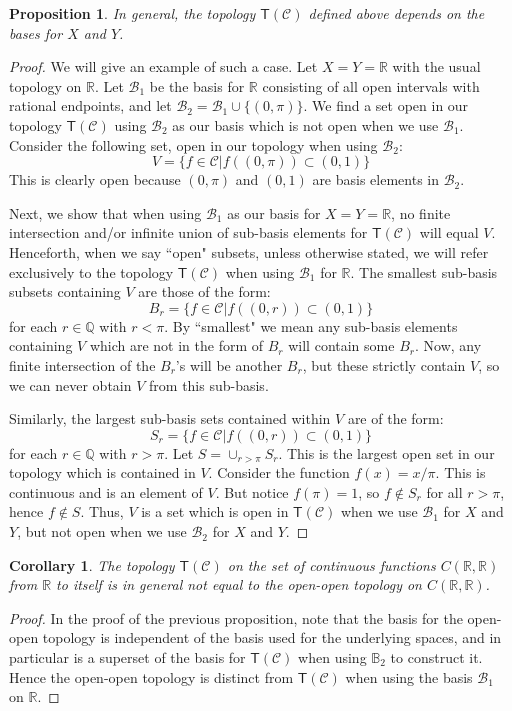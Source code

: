 \documentclass[review]{elsarticle}
\theoremstyle{plain}%
\newtheorem{prop}[thm]{Proposition}
\newtheorem{cor}{Corollary}
\theoremstyle{definition}
\theoremstyle{remark}
\begin{document}
\begin{prop}
	In general, the topology $\mathsf{T}(\mathcal{C})$ defined above depends on the bases for $X$ and $Y$. 
\end{prop}
\begin{proof}
	We will give an example of such a case. Let $X=Y=\mathbb{R}$ with the usual topology on $\mathbb{R}$. Let $\mathcal{B}_1$ be the basis for $\mathbb{R}$ consisting of all open intervals with rational endpoints, and let $\mathcal{B}_2 = \mathcal{B}_1\cup\{(0,\pi)\}$. We find a set open in our topology $\mathsf{T}(\mathcal{C})$ using $\mathcal{B}_2$ as our basis which is not open when we use $\mathcal{B}_1$. Consider the following set, open in our topology when using $\mathcal{B}_2$:
	$$
	V = \{f\in\mathcal{C}| f((0,\pi))\subset(0,1)\}
	$$
	This is clearly open because $(0,\pi)$ and $(0,1)$ are basis elements in $\mathcal{B}_2$. 
	
	Next, we show that when using $\mathcal{B}_1$ as our basis for $X=Y=\mathbb{R}$, no finite intersection and/or infinite union of sub-basis elements for $\mathsf{T}(\mathcal{C})$ will equal $V$. Henceforth, when we say ``open" subsets, unless otherwise stated, we will refer exclusively to the topology $\mathsf{T}(\mathcal{C})$ when using $\mathcal{B}_1$ for $\mathbb{R}$. The smallest sub-basis subsets containing $V$ are those of the form:
	$$
	B_r = \{f\in\mathcal{C} | f((0,r))\subset(0,1)\}
	$$
	for each $r\in\mathbb{Q}$ with $r<\pi$. By ``smallest" we mean any sub-basis elements containing $V$ which are not in the form of $B_r$ will contain some $B_r$. Now, any finite intersection of the $B_r$'s will be another $B_r$, but these strictly contain $V$, so we can never obtain $V$ from this sub-basis. 
	
	Similarly, the largest sub-basis sets contained within $V$ are of the form: 
	$$
	S_r = \{f\in\mathcal{C} | f((0,r))\subset(0,1)\}
	$$
	for each $r\in \mathbb{Q}$ with $r>\pi$. Let $S = \cup_{r>\pi}S_r$. This is the largest open set in our topology which is contained in $V$. Consider the function $f(x) = x/\pi$. This is continuous and is an element of $V$. But notice $f(\pi)=1$, so $f\notin S_r$ for all $r>\pi$, hence $f\notin S$. Thus, $V$ is a set which is open in $\mathsf{T}(\mathcal{C})$ when we use $\mathcal{B}_1$ for $X$ and $Y$, but not open when we use $\mathcal{B}_2$ for $X$ and $Y$. 
\end{proof}


\begin{cor}
The topology $\mathsf{T}(\mathcal{C})$ on the set of continuous functions $C(\mathbb{R},\mathbb{R})$ from $\mathbb{R}$ to itself is in general not equal to the open-open topology on $C(\mathbb{R},\mathbb{R})$.
\end{cor}
\begin{proof}
In the proof of the previous proposition, note that the basis for the open-open topology is independent of the basis used for the underlying spaces, and in particular is a superset of the basis for $\mathsf{T}(\mathcal{C})$ when using $\mathbb{B}_2$ to construct it. Hence the open-open topology is distinct from $\mathsf{T}(\mathcal{C})$ when using the basis $\mathcal{B}_1$ on $\mathbb{R}$. 
\end{proof}
\end{document}
